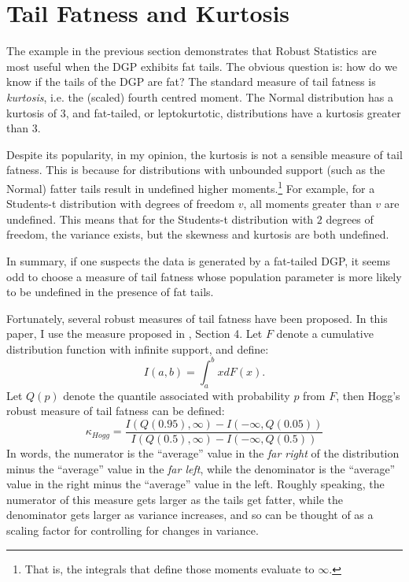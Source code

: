 \documentclass[12pt,a4paper]{amsart}
\renewcommand{\k}{\kappa}
\newcommand{\can}{\citeasnoun}							%
\begin{document}
\section{Tail Fatness and Kurtosis}\label{secTailFatness}

The example in the previous section demonstrates that Robust Statistics are most useful when the DGP exhibits fat tails. The obvious question is: how do we know if the tails of the DGP are fat? The standard measure of tail fatness is \emph{kurtosis}, i.e. the (scaled) fourth centred moment. The Normal distribution has a kurtosis of $3$, and fat-tailed, or leptokurtotic, distributions have a kurtosis greater than $3$.

Despite its popularity, in my opinion, the kurtosis is not a sensible measure of tail fatness. This is because for distributions with unbounded support (such as the Normal) fatter tails result in undefined higher moments.\footnote{That is, the integrals that define those moments evaluate to $\infty$.} For example, for a Students-t distribution with degrees of freedom $v$, all moments greater than $v$ are undefined. This means that for the Students-t distribution with $2$ degrees of freedom, the variance exists, but the skewness and kurtosis are both undefined.

In summary, if one suspects the data is generated by a fat-tailed DGP, it seems odd to choose a measure of tail fatness whose population parameter is more likely to be undefined in the presence of fat tails.

Fortunately, several robust measures of tail fatness have been proposed. In this paper, I use the measure proposed in \can{Hogg_(1974)}, Section 4. Let $F$ denote a cumulative distribution function with infinite support, and define:
\begin{equation}
I(a, b) = \int_a^b x dF(x) .
\end{equation}
Let $Q(p)$ denote the quantile associated with probability $p$ from $F$, then Hogg's robust measure of tail fatness can be defined:
\begin{equation}
\k_{Hogg} = \frac{I(Q(0.95), \infty) - I(-\infty, Q(0.05))}{I(Q(0.5), \infty) - I(-\infty, Q(0.5))}
\end{equation}
In words, the numerator is the ``average'' value in the \emph{far right} of the distribution minus the ``average'' value in the \emph{far left}, while the denominator is the ``average'' value in the right minus the ``average'' value in the left. Roughly speaking, the numerator of this measure gets larger as the tails get fatter, while the denominator gets larger as variance increases, and so can be thought of as a scaling factor for controlling for changes in variance.
\end{document}
